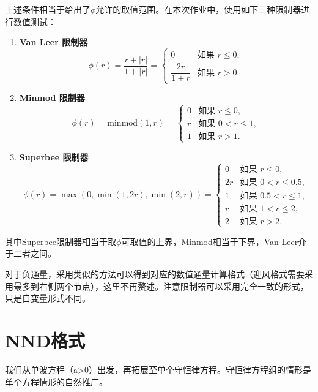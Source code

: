 \documentclass[12pt, a4paper]{article}
\begin{document}
上述条件相当于给出了$\phi$允许的取值范围。在本次作业中，使用如下三种限制器进行数值测试：
\begin{enumerate}
    \item \textbf{Van Leer 限制器} 
    \begin{equation*}
        \phi(r) = \frac{r + |r|}{1 + |r|} = 
        \begin{cases}
            0 & \text{如果 } r \leq 0, \\
            \dfrac{2r}{1 + r} & \text{如果 } r > 0.
        \end{cases}
    \end{equation*}

    \item \textbf{Minmod 限制器}
    \begin{equation*}
        \phi(r) = \text{minmod}(1, r) = 
        \begin{cases}
            0 & \text{如果 } r \leq 0, \\
            r & \text{如果 } 0 < r \leq 1, \\
            1 & \text{如果 } r > 1.
        \end{cases}
    \end{equation*}

    \item \textbf{Superbee 限制器}
    \begin{equation*}
        \phi(r) = \max\left(0, \min(1, 2r), \min(2, r)\right) = 
        \begin{cases}
            0 & \text{如果 } r \leq 0, \\
            2r & \text{如果 } 0 < r \leq 0.5, \\
            1 & \text{如果 } 0.5 < r \leq 1, \\
            r & \text{如果 } 1 < r \leq 2, \\
            2 & \text{如果 } r > 2.
        \end{cases}
    \end{equation*}
\end{enumerate}

其中Superbee限制器相当于取$\phi$可取值的上界，Minmod相当于下界，Van Leer介于二者之间。

对于负通量，采用类似的方法可以得到对应的数值通量计算格式（迎风格式需要采用最多到右侧两个节点），这里不再赘述。注意限制器可以采用完全一致的形式，
只是自变量形式不同。

\section{NND格式}
我们从单波方程（a>0）出发，再拓展至单个守恒律方程。守恒律方程组的情形是单个方程情形的自然推广。
\end{document}
